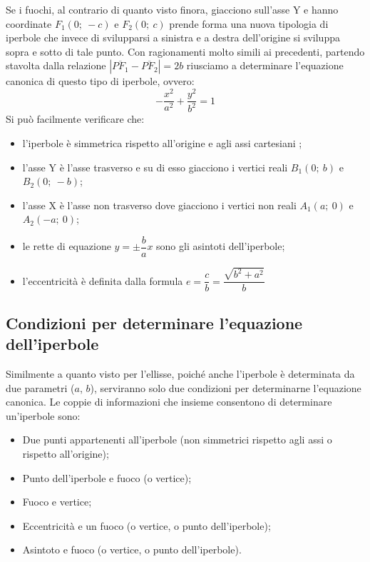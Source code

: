 Se i fuochi, al contrario di quanto visto finora, giacciono sull'asse Y e 
hanno coordinate $ F_{1} (0;~-c)$ e $ F_{2} (0;~c)$ prende forma una nuova 
tipologia di iperbole che invece di svilupparsi a sinistra e a destra 
dell'origine si sviluppa sopra e sotto di tale punto.
Con ragionamenti molto simili ai precedenti, partendo stavolta dalla relazione 
$\left|\overline{PF_{1}}-\overline{PF_{2}}\right|=2b$ riusciamo a 
determinare l'equazione canonica di questo tipo di iperbole, ovvero: 
\begin{equation}
-\dfrac{x^{2}}{a^{2}}+\dfrac{y^{2}}{b^{2}}=1
\end{equation}
Si può facilmente verificare che:
\begin{itemize} [noitemsep]
  \item l'iperbole è simmetrica rispetto all'origine e agli assi 
cartesiani ;
  \item l'asse Y è l'asse trasverso e su di esso giacciono i vertici 
reali $ B_{1} (0;~b)$ e $ B_{2} (0;~-b)$;
  \item l'asse X è l'asse non trasverso dove giacciono i vertici non 
reali $ A_{1} (a;~0)$ e $ A_{2} (-a;~0)$;
  \item le rette di equazione $y= \pm \dfrac{b}{a}  x$ sono gli asintoti dell'iperbole;
  \item l'eccentricità è definita dalla formula 
$e=\dfrac{c}{b}=\dfrac{\sqrt{b^{2}+a^{2}}}{b} $
\end{itemize}

\subsection{Condizioni per determinare l'equazione dell'iperbole}

Similmente a quanto visto per l'ellisse, poiché anche l'iperbole 
è determinata da due parametri ($a$, $b$), serviranno solo due condizioni per 
determinarne l'equazione canonica.
Le coppie di informazioni che insieme consentono di determinare un'iperbole 
sono:
\begin{itemize}[noitemsep]
\item Due punti appartenenti all'iperbole (non simmetrici rispetto 
agli assi o rispetto all'origine);
\item Punto dell'iperbole e fuoco (o vertice);
\item Fuoco e vertice;
\item Eccentricità e un fuoco (o vertice, o punto dell'iperbole);
\item Asintoto e fuoco (o vertice, o punto dell'iperbole).
\end{itemize}

